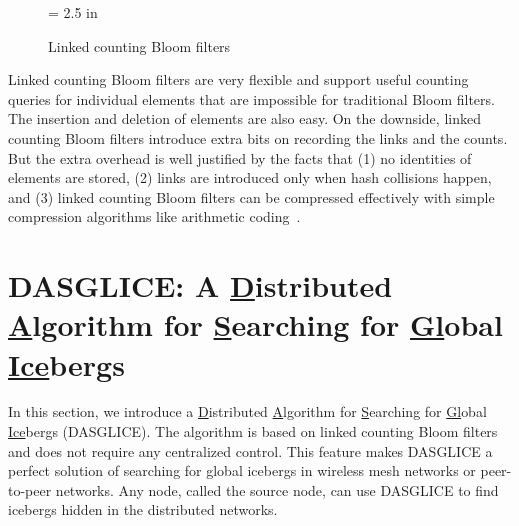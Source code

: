 \documentclass[11pt,twocolumn]{IEEEtran} %
\begin{document}
\begin{figure}[tp]
\centerline {\epsfxsize = 2.5 in }
\caption{Linked counting Bloom filters}
\label{fig:example}
\end{figure}

Linked counting Bloom filters are very flexible and support useful counting queries for individual elements that are impossible for traditional Bloom filters. The insertion and deletion of elements are also easy. On the downside, linked counting Bloom filters introduce extra bits on recording the links and the counts. But the extra overhead is well justified by the facts that (1) no identities of elements are stored, (2) links are introduced only when hash collisions happen, and (3) linked counting Bloom filters can be compressed effectively with simple compression algorithms like arithmetic coding~\cite{Michael}.        


\section{DASGLICE: A \underline{D}istributed \underline{A}lgorithm for \underline{S}earching for \underline{Gl}obal \underline{Ice}bergs}

In this section, we introduce a \underline{D}istributed \underline{A}lgorithm for \underline{S}earching for \underline{Gl}obal \underline{Ice}bergs (DASGLICE). The algorithm is based on linked counting Bloom filters and does not require any centralized control. This feature makes DASGLICE a perfect solution of searching for global icebergs in wireless mesh networks or peer-to-peer networks. Any node, called the source node, can use DASGLICE to find icebergs hidden in the distributed networks. 
\end{document}
